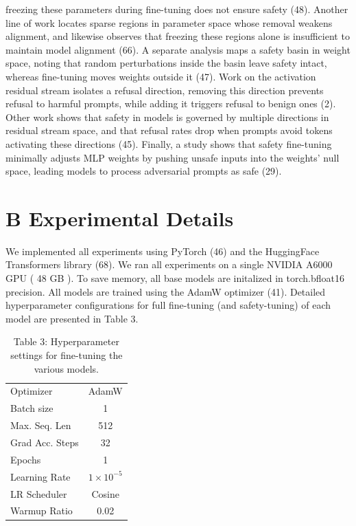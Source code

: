 \documentclass[10pt]{article}
\begin{document}
freezing these parameters during fine-tuning does not ensure safety (48). Another line of work locates sparse regions in parameter space whose removal weakens alignment, and likewise observes that freezing these regions alone is insufficient to maintain model alignment (66). A separate analysis maps a safety basin in weight space, noting that random perturbations inside the basin leave safety intact, whereas fine-tuning moves weights outside it (47). Work on the activation residual stream isolates a refusal direction, removing this direction prevents refusal to harmful prompts, while adding it triggers refusal to benign ones (2). Other work shows that safety in models is governed by multiple directions in residual stream space, and that refusal rates drop when prompts avoid tokens activating these directions (45). Finally, a study shows that safety fine-tuning minimally adjusts MLP weights by pushing unsafe inputs into the weights' null space, leading models to process adversarial prompts as safe (29).

\section*{B Experimental Details}
We implemented all experiments using PyTorch (46) and the HuggingFace Transformers library (68). We ran all experiments on a single NVIDIA A6000 GPU ( 48 GB ). To save memory, all base models are initalized in torch.bfloat16 precision. All models are trained using the AdamW optimizer (41). Detailed hyperparameter configurations for full fine-tuning (and safety-tuning) of each model are presented in Table 3.

\begin{table}[h]
\begin{center}
\captionsetup{labelformat=empty}
\caption{Table 3: Hyperparameter settings for fine-tuning the various models.}
\begin{tabular}{l|c}
\hline
Optimizer & AdamW \\
Batch size & 1 \\
Max. Seq. Len & 512 \\
Grad Acc. Steps & 32 \\
Epochs & 1 \\
Learning Rate & $1 \times 10^{-5}$ \\
LR Scheduler & Cosine \\
Warmup Ratio & 0.02 \\
\hline
\end{tabular}
\end{center}
\end{table}
\end{document}
